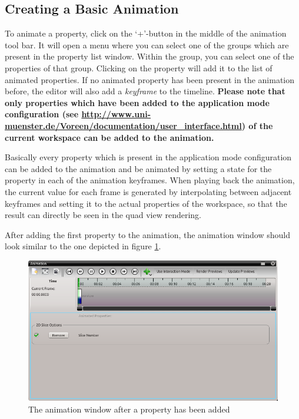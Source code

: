 \subsection*{Creating a Basic Animation}
To animate a property, click on the `+'-button in the middle of the animation tool bar. It will open a menu where you can select one of the groups 
which are present in the property list window. Within the group, you can select one of the properties of that group. Clicking on the property will add 
it to the list of animated properties. If no animated property has been present in the animation before, the editor will also add a \emph{keyframe} to the
timeline. \textbf{Please note that only properties which have been added to the application mode configuration (see \url{http://www.uni-muenster.de/Voreen/documentation/user_interface.html}) of the current workspace can be added to the animation.}

Basically every property which is present in the application mode configuration can be added to the animation and be animated by setting a state for the property
in each of the animation keyframes. When playing back the animation, the current value for each frame is generated by interpolating between adjacent keyframes and 
setting it to the actual properties of the workspace, so that the result can directly be seen in the quad view rendering.

After adding the first property to the animation, the animation window should look similar to the one depicted in figure \ref{fig:animation_keyframe}.

\begin{figure}[!htb]
 \centering
 \includegraphics[scale=0.5,keepaspectratio=true]{./images/animation_keyframe.png}
 \caption{The animation window after a property has been added}
 \label{fig:animation_keyframe}
\end{figure}

